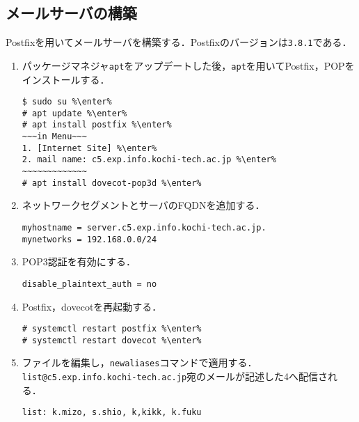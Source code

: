\subsection{メールサーバの構築}
Postfixを用いてメールサーバを構築する．Postfixのバージョンは\texttt{3.8.1}である．
\begin{enumerate}
    \renewcommand{\labelenumi}{\textbf{\theenumi.}\ }
    \item パッケージマネジャ\texttt{apt}をアップデートした後，\texttt{apt}を用いてPostfix，POPをインストールする．
          \begin{lstlisting}
$ sudo su %\enter%
# apt update %\enter%
# apt install postfix %\enter%
~~~in Menu~~~
1. [Internet Site] %\enter%
2. mail name: c5.exp.info.kochi-tech.ac.jp %\enter%
~~~~~~~~~~~~~
# apt install dovecot-pop3d %\enter%
\end{lstlisting}
    \item ネットワークセグメントとサーバのFQDNを追加する．
          \begin{lstlisting}[style=file,caption={\ttfamily /etc/postfix/main.cf}]
myhostname = server.c5.exp.info.kochi-tech.ac.jp.
mynetworks = 192.168.0.0/24
    \end{lstlisting}
    \item POP3認証を有効にする．
          \begin{lstlisting}[style=file,caption={\ttfamily /etc/dovecot/conf.d/10-auth.conf}]
disable_plaintext_auth = no
\end{lstlisting}
    \item Postfix，dovecotを再起動する．
          \begin{lstlisting}
# systemctl restart postfix %\enter%
# systemctl restart dovecot %\enter%
    \end{lstlisting}
    \item \aliases ファイルを編集し，\texttt{newaliases}コマンドで適用する．\texttt{list@c5.exp.info.kochi-tech.ac.jp}宛のメールが記述した4\user へ配信される．
          \begin{lstlisting}[style=file,caption={\ttfamily /etc/aliases}]
list: k.mizo, s.shio, k,kikk, k.fuku
    \end{lstlisting}
\end{enumerate}
\clearpage
